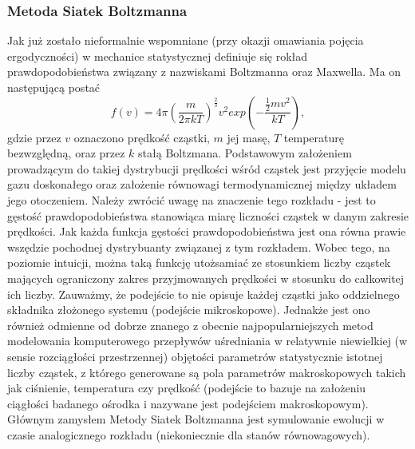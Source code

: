 \documentclass[12pt]{article}
\begin{document}
\subsubsection{Metoda Siatek Boltzmanna}
Jak już zostało nieformalnie wspomniane (przy okazji omawiania pojęcia ergodyczności) w mechanice statystycznej definiuje się rokład prawdopodobieństwa związany z nazwiskami Boltzmanna oraz Maxwella. Ma on następującą postać 
\begin{equation}
f(v) = 4\pi(\frac{m}{2\pi kT})^{\frac{2}{3}}v^{2}exp(-\frac{\frac{1}{2}mv^{2}}{kT}),
\end{equation}
gdzie przez $ v $ oznaczono prędkość cząstki, $ m $ jej masę, $ T $ temperaturę bezwzględną, oraz przez $ k $ stałą Boltzmana.
Podstawowym założeniem prowadzącym do takiej dystrybucji prędkości wśród cząstek jest przyjęcie modelu gazu doskonałego oraz założenie równowagi termodynamicznej między układem jego otoczeniem. Należy zwrócić uwagę na znaczenie tego rozkładu - jest to gęstość prawdopodobieństwa stanowiąca miarę liczności cząstek w danym zakresie prędkości. Jak każda funkcja gęstości prawdopodobieństwa jest ona równa prawie wszędzie pochodnej dystrybuanty związanej z tym rozkładem. Wobec tego, na poziomie intuicji, można taką funkcję utożsamiać ze stosunkiem liczby cząstek mających ograniczony zakres przyjmowanych prędkości w stosunku do całkowitej ich liczby. Zauważmy, że podejście to nie opisuje każdej cząstki jako oddzielnego składnika złożonego systemu (podejście mikroskopowe). Jednakże jest ono również odmienne od dobrze znanego z obecnie najpopularniejszych metod modelowania komputerowego przepływów uśredniania w relatywnie niewielkiej (w sensie rozciągłości przestrzennej) objętości parametrów statystycznie istotnej liczby cząstek, z którego generowane są pola parametrów makroskopowych takich jak ciśnienie, temperatura czy prędkość (podejście to bazuje na założeniu ciągłości badanego ośrodka i nazywane jest podejściem makroskopowym). Głównym zamysłem Metody Siatek Boltzmanna jest symulowanie ewolucji w czasie analogicznego rozkładu (niekoniecznie dla stanów równowagowych).
\end{document}
